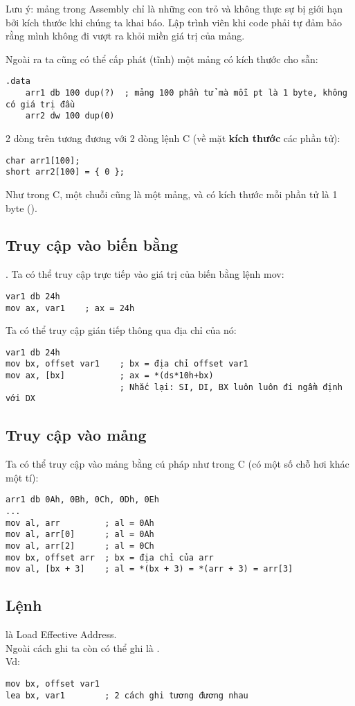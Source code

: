 \documentclass[main.tex]{subfiles}
\begin{document}
Lưu ý: mảng trong Assembly chỉ là những con trỏ và không thực sự bị giới hạn bởi kích thước khi chúng ta khai báo. Lập trình viên khi code phải tự đảm bảo rằng mình không đi vượt ra khỏi miền giá trị của mảng.

Ngoài ra ta cũng có thể cấp phát (tĩnh) một mảng có kích thước cho sẵn:
\begin{verbatim}
.data
    arr1 db 100 dup(?)  ; mảng 100 phần tử mà mỗi pt là 1 byte, không có giá trị đầu
    arr2 dw 100 dup(0)
\end{verbatim}
2 dòng trên tương đương với 2 dòng lệnh C (về mặt \textbf{kích thước} các phần tử):
\begin{verbatim}
char arr1[100];
short arr2[100] = { 0 }; 
\end{verbatim}

Như trong C, một chuỗi cũng là một mảng, và có kích thước mỗi phần tử là 1 byte ().

\subsection{Truy cập vào biến bằng }.
Ta có thể truy cập trực tiếp vào giá trị của biến bằng lệnh mov:
\begin{verbatim}
var1 db 24h
mov ax, var1    ; ax = 24h
\end{verbatim}
Ta có thể truy cập gián tiếp thông qua địa chỉ của nó:
\begin{verbatim}
var1 db 24h            
mov bx, offset var1    ; bx = địa chỉ offset var1
mov ax, [bx]           ; ax = *(ds*10h+bx) 
                       ; Nhắc lại: SI, DI, BX luôn luôn đi ngầm định với DX
\end{verbatim}

\subsection{Truy cập vào mảng}
Ta có thể truy cập vào mảng bằng cú pháp như trong C (có một số chỗ hơi khác một tí):
\begin{verbatim}
arr1 db 0Ah, 0Bh, 0Ch, 0Dh, 0Eh 
... 
mov al, arr         ; al = 0Ah 
mov al, arr[0]      ; al = 0Ah 
mov al, arr[2]      ; al = 0Ch 
mov bx, offset arr  ; bx = địa chỉ của arr
mov al, [bx + 3]    ; al = *(bx + 3) = *(arr + 3) = arr[3]
\end{verbatim}

\subsection{Lệnh }
 là Load Effective Address.\\
Ngoài cách ghi  ta còn có thể ghi là .\\
Vd:
\begin{verbatim}
mov bx, offset var1 
lea bx, var1        ; 2 cách ghi tương đương nhau
\end{verbatim}
\end{document}
